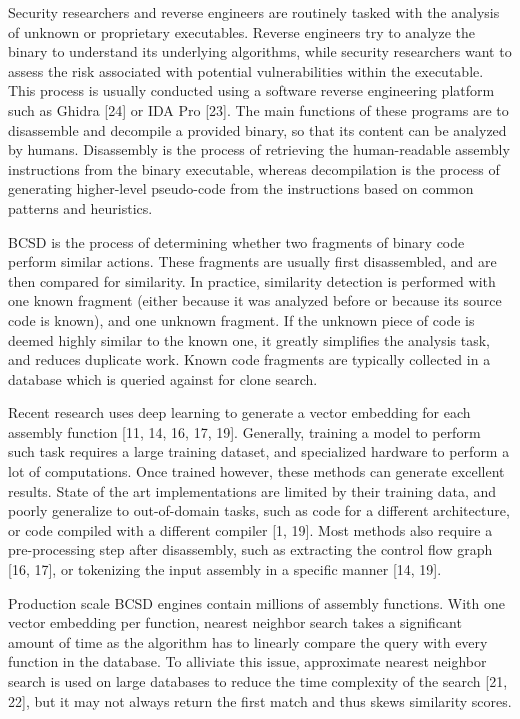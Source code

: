 \documentclass[conference,compsoc]{IEEEtran}
\begin{document}
Security researchers and reverse engineers are routinely tasked with the analysis of unknown or proprietary executables.
Reverse engineers try to analyze the binary to understand its underlying algorithms, while security researchers want to assess
the risk associated with potential vulnerabilities within the executable. This process is usually conducted using
a software reverse engineering platform such as Ghidra [24] or IDA Pro [23]. The main functions of these programs are to
disassemble and decompile a provided binary, so that its content can be analyzed by humans. Disassembly is
the process of retrieving the human-readable assembly instructions from the binary executable, whereas decompilation
is the process of generating higher-level pseudo-code from the instructions based on common patterns and heuristics.

BCSD is the process of determining whether two fragments of binary code perform similar actions.
These fragments are usually first disassembled, and are then compared for similarity. In practice,
similarity detection is performed with one known fragment (either because it was analyzed before
or because its source code is known), and one unknown fragment. If the unknown piece of code is deemed
highly similar to the known one, it greatly simplifies the analysis task, and reduces duplicate work. Known
code fragments are typically collected in a database which is queried against for clone search.

Recent research uses deep learning to generate a vector embedding for each assembly function [11, 14, 16, 17, 19].
Generally, training a model to perform such task requires a large training dataset, and specialized
hardware to perform a lot of computations. Once trained however, these methods can generate excellent results.
State of the art implementations are limited by their training data, and poorly generalize to out-of-domain tasks,
such as code for a different architecture, or code compiled with a different compiler [1, 19]. Most methods also require
a pre-processing step after disassembly, such as extracting the control flow graph [16, 17], or tokenizing the input
assembly in a specific manner [14, 19].

Production scale BCSD engines contain millions of assembly functions. With one vector embedding per function, nearest neighbor
search takes a significant amount of time as the algorithm has to linearly compare the query with every function in the database.
To alliviate this issue, approximate nearest neighbor search is used on large databases to reduce the time complexity of the
search [21, 22], but it may not always return the first match and thus skews similarity scores.
\end{document}
